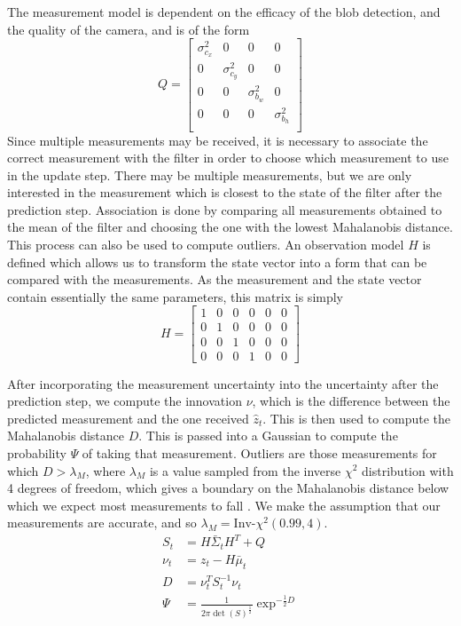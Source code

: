 \documentclass[conference]{IEEEtran}
\begin{document}
The measurement model is dependent on the efficacy of the blob detection, and
the quality of the camera, and is of the form
\begin{equation}
  \label{eq:qmat}
  Q=\begin{bmatrix}
    \sigma_{c_x}^2&0&0&0\\
    0&\sigma_{c_y}^2&0&0\\
    0&0&\sigma_{b_w}^2&0\\
    0&0&0&\sigma_{b_h}^2\\
  \end{bmatrix}
\end{equation}
Since multiple measurements may be received, it is necessary to associate the
correct measurement with the filter in order to choose which measurement to use
in the update step. There may be multiple measurements, but we are only
interested in the measurement which is closest to the state of the filter after
the prediction step. Association is done by comparing all measurements obtained
to the mean of the filter and choosing the one with the lowest Mahalanobis
distance. This process can also be used to compute outliers. An observation
model $H$ is defined which allows us to transform the state vector into a form
that can be compared with the measurements. As the measurement and the state
vector contain essentially the same parameters, this matrix is simply
\begin{equation}
  H=
  \begin{bmatrix}
    1&0&0&0&0&0\\
    0&1&0&0&0&0\\
    0&0&1&0&0&0\\
    0&0&0&1&0&0
  \end{bmatrix}
\end{equation}

After incorporating the measurement uncertainty into the uncertainty after the
prediction step, we compute the innovation $\nu$, which is the difference
between the predicted measurement and the one received $\hat{z}_t$. This is then
used to compute the Mahalanobis distance $D$. This is passed into a Gaussian to
compute the probability $\Psi$ of taking that measurement. Outliers are those
measurements for which $D>\lambda_M$, where $\lambda_M$ is a value sampled from
the inverse $\chi^2$ distribution with 4 degrees of freedom, which gives a
boundary on the Mahalanobis distance below which we expect most measurements to
fall \cite{thrun2005prob}. We make the assumption that our measurements are
accurate, and so $\lambda_M=\text{Inv-}\chi^2(0.99,4)$.
\begin{align}
  \label{eq:assoc1}
  S_t&=H\bar{\Sigma}_tH^T+Q\\
  \nu_t&=z_t-H\bar{\mu}_t\\
  D&=\nu_t^TS_t^{-1}\nu_t\\
  \label{eq:assoc4}
  \Psi&=\frac{1}{2\pi \det(S)^{\frac{1}{2}}}\exp^{-\frac{1}{2}D}
\end{align}
\end{document}
